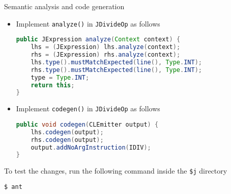 \documentclass[8pt,a4paper,compress]{beamer}
\begin{document}
\begin{frame}[fragile]
\pause

Semantic analysis and code generation
\begin{itemize}
\item Implement \lstinline{analyze()} in \lstinline{JDivideOp} as follows

\begin{lstlisting}[language=Java]
public JExpression analyze(Context context) {
    lhs = (JExpression) lhs.analyze(context);
    rhs = (JExpression) rhs.analyze(context);
    lhs.type().mustMatchExpected(line(), Type.INT);
    rhs.type().mustMatchExpected(line(), Type.INT);
    type = Type.INT;
    return this;
}
\end{lstlisting}

\item Implement \lstinline{codegen()} in \lstinline{JDivideOp} as follows

\begin{lstlisting}[language=Java]
public void codegen(CLEmitter output) {
    lhs.codegen(output);
    rhs.codegen(output);
    output.addNoArgInstruction(IDIV);
}
\end{lstlisting}
\end{itemize}

\pause
\bigskip

To test the changes, run the following command inside the \lstinline{$j} directory

\begin{lstlisting}[language=Java]
$ ant
\end{lstlisting}
\end{frame}
\end{document}
